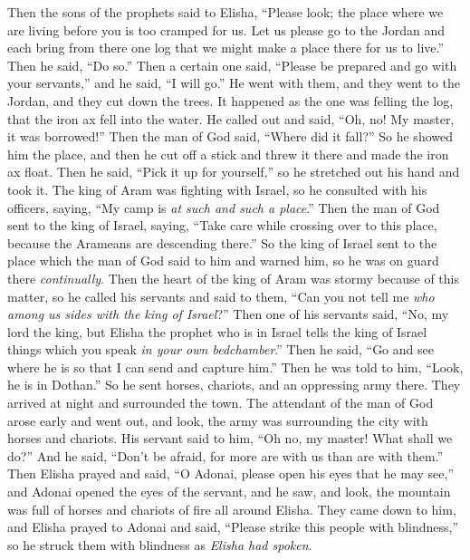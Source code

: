 \begin{biblechapter} %
 Then the sons of the prophets said to Elisha, “Please look; the place where we are living before you is too cramped for us.
\verse Let us please go to the Jordan and each bring from there one log that we might make a place there for us to live.” Then he said, “Do so.”
\verse Then a certain one said, “Please be prepared and go with your servants,” and he said, “I will go.”
\verse He went with them, and they went to the Jordan, and they cut down the trees.
\verse It happened as the one was felling the log, that the iron ax fell into the water. He called out and said, “Oh, no! My master, it was borrowed!”
\verse Then the man of God said, “Where did it fall?” So he showed him the place, and then he cut off a stick and threw it there and made the iron ax float.
\verse Then he said, “Pick it up for yourself,” so he stretched out his hand and took it.
 The king of Aram was fighting with Israel, so he consulted with his officers, saying, “My camp is \textit{at such and such a place}.”
\verse Then the man of God sent to the king of Israel, saying, “Take care while crossing over to this place, because the Arameans are descending there.”
\verse So the king of Israel sent to the place which the man of God said to him and warned him, so he was on guard there \textit{continually}.
\verse Then the heart of the king of Aram was stormy because of this matter, so he called his servants and said to them, “Can you not tell me \textit{who among us sides with the king of Israel}?”
\verse Then one of his servants said, “No, my lord the king, but Elisha the prophet who is in Israel tells the king of Israel things which you speak \textit{in your own bedchamber}.”
\verse Then he said, “Go and see where he is so that I can send and capture him.” Then he was told to him, “Look, he is in Dothan.”
\verse So he sent horses, chariots, and an oppressing army there. They arrived at night and surrounded the town.
\verse The attendant of the man of God arose early and went out, and look, the army was surrounding the city with horses and chariots. His servant said to him, “Oh no, my master! What shall we do?”
\verse And he said, “Don’t be afraid, for more are with us than are with them.”
\verse Then Elisha prayed and said, “O Adonai, please open his eyes that he may see,” and Adonai opened the eyes of the servant, and he saw, and look, the mountain was full of horses and chariots of fire all around Elisha.
\verse They came down to him, and Elisha prayed to Adonai and said, “Please strike this people with blindness,” so he struck them with blindness as \textit{Elisha had spoken}.

\end{biblechapter}
